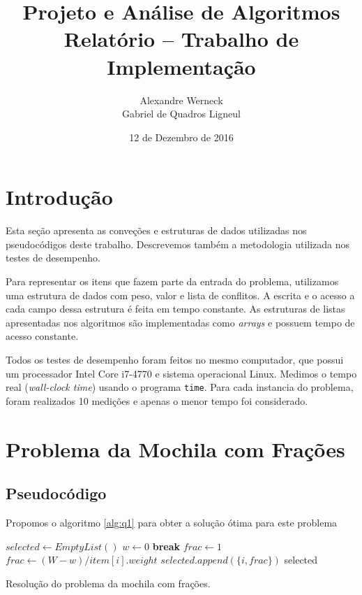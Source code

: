 \documentclass[a4paper]{article}
\title{Projeto e Análise de Algoritmos\\Relatório -- Trabalho de Implementação}
\author{Alexandre Werneck\\Gabriel de Quadros Ligneul}
\date{12 de Dezembro de 2016}
\begin{document}
\maketitle

\section{Introdução}

Esta seção apresenta as conveções e estruturas de dados utilizadas nos pseudocódigos deste trabalho. Descrevemos também a metodologia utilizada nos testes de desempenho.

Para representar os itens que fazem parte da entrada do problema, utilizamos uma estrutura de dados com peso, valor e lista de conflitos. A escrita e o acesso a cada campo dessa estrutura é feita em tempo constante. As estruturas de listas apresentadas nos algoritmos são implementadas como \emph{arrays} e possuem tempo de acesso constante.

Todos os testes de desempenho foram feitos no mesmo computador, que possui um processador Intel Core i7-4770 e sistema operacional Linux. Medimos o tempo real (\emph{wall-clock time}) usando o programa \texttt{time}. Para cada instancia do problema, foram realizados 10 medições e apenas o menor tempo foi considerado.

\section{Problema da Mochila com Frações}

\subsection{Pseudocódigo}

Propomos o algoritmo \ref{alg:q1} para obter a solução ótima para este problema

\begin{algorithm}[H]
\begin{algorithmic}[1]
    \EndFor
    \State $selected \gets EmptyList()$
    \State $w \gets 0$
        \State \textbf{break}
        \State $frac \gets 1$
      \Else
        \State $frac \gets (W - w) / item[i].weight$
      \EndIf
      \State $selected.append(\{i, frac\})$
    \EndFor
    \State \Return selected
  \EndFunction
\end{algorithmic}
\caption{Resolução do problema da mochila com frações.}
\label{alg:q1}
\end{algorithm}
\end{document}
